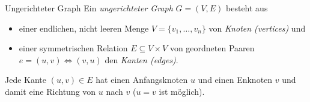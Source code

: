 \begin{defi}{Ungerichteter Graph}
    Ein \emph{ungerichteter Graph} $G = (V, E)$ besteht aus
    \begin{itemize}
        \item einer endlichen, nicht leeren Menge $V = \{v_1, \ldots, v_n\}$ von \emph{Knoten (vertices)} und
        \item einer symmetrischen Relation $E \subseteq V \times V$ von geordneten Paaren $e = (u, v) \iff (v, u)$ den \emph{Kanten (edges)}.
    \end{itemize}

    Jede Kante $(u,v) \in E$ hat einen Anfangsknoten $u$ und einen Enknoten $v$ und damit eine Richtung von $u$ nach $v$ ($u=v$ ist möglich).

    \vspace{1em}
    \begin{center}
    \end{center}
\end{defi}

